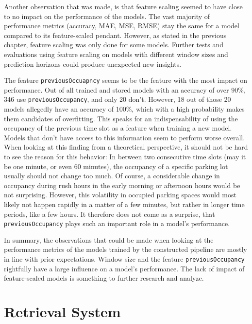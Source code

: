   Another observation that was made, is that feature scaling seemed to have close to no impact on the performance of the models. The vast majority of performance metrics (accuracy, MAE, MSE, RMSE) stay the same for a model compared to its feature-scaled pendant. However, as stated in the previous chapter, feature scaling was only done for some models. Further tests and evaluations using feature scaling on models with different window sizes and prediction horizons could produce unexpected new insights.
  
  The feature \texttt{previousOccuapncy} seems to be the feature with the most impact on performance. Out of all trained and stored models with an accuracy of over 90\%, 346 use \texttt{previousOccupancy}, and only 20 don’t. However, 18 out of those 20 models allegedly have an accuracy of 100\%, which with a high probability makes them candidates of overfitting. This speaks for an indispensability of using the occupancy of the previous time slot as a feature when training a new model. Models that don’t have access to this information seem to perform worse overall. When looking at this finding from a theoretical perspective, it should not be hard to see the reason for this behavior: In between two consecutive time slots (may it be one minute, or even 60 minutes), the occupancy of a specific parking lot usually should not change too much. Of course, a considerable change in occupancy during rush hours in the early morning or afternoon hours would be not surprising. However, this volatility in occupied parking spaces would most likely not happen rapidly in a matter of a few minutes, but rather in longer time periods, like a few hours. It therefore does not come as a surprise, that \texttt{previousOccupancy} plays such an important role in a model’s performance.
  
  In summary, the observations that could be made when looking at the performance metrics of the models trained by the constructed pipeline are mostly in line with prior expectations. Window size and the feature \texttt{previousOccupancy} rightfully have a large influence on a model’s performance. The lack of impact of feature-scaled models is something to further research and analyze.
  
  
  
  \section{Retrieval System}

